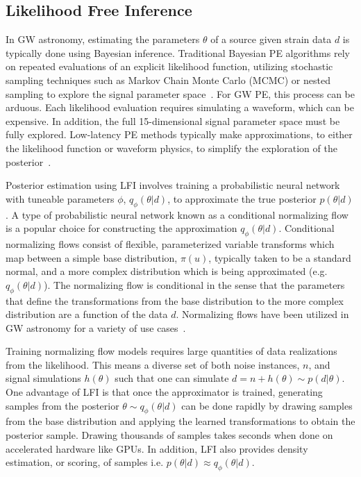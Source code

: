 \begin{refsection}
\section{Likelihood Free Inference} \label{amp_res_sec:lfi}
In GW astronomy, estimating the parameters $\theta$ of a source given strain data $d$ is typically done using Bayesian inference. 
Traditional Bayesian PE algorithms rely on repeated evaluations of an explicit likelihood function, utilizing stochastic sampling techniques such as Markov Chain Monte Carlo (MCMC) or nested sampling to explore the signal parameter space~\cite{Ashton_2019, lalinference_paper}. 
For GW PE, this process can be arduous. 
Each likelihood evaluation requires simulating a waveform, which can be expensive. 
In addition, the full 15-dimensional signal parameter space must be fully explored. 
Low-latency PE methods typically make approximations, to either the likelihood function or waveform physics, to simplify the exploration of the posterior~\cite{Canizares:2014fya, Morisaki:2023kuq, Morisaki:2020oqk, Singer_2016}.

Posterior estimation using LFI involves training a probabilistic neural network with tuneable parameters $\phi$, $q_\phi(\theta | d)$, to approximate the true posterior $p(\theta | d)$. 
A type of probabilistic neural network known as a conditional normalizing flow~\cite{papamakarios2021normalizing} is a popular choice for constructing the approximation $q_\phi(\theta | d)$. 
Conditional normalizing flows consist of flexible, parameterized variable transforms which map between a simple base distribution, $\pi(u)$, typically taken to be a standard normal, and a more complex distribution which is being approximated (e.g. $q_\phi(\theta|d)$). 
The normalizing flow is conditional in the sense that the parameters that define the transformations from the base distribution to the more complex distribution are a function of the data $d$. 
Normalizing flows have been utilized in GW astronomy for a variety of use cases~\cite{Dax_2021, Dax_2025, Williams:2021qyt, PhysRevD.109.102004}.

Training normalizing flow models requires large quantities of data realizations from the likelihood. 
This means a diverse set of both noise instances, $n$, and signal simulations $h(\theta)$ such that one can simulate $d = n + h(\theta) \sim p(d|\theta)$. 
One advantage of LFI is that once the approximator is trained, generating samples from the posterior $\theta \sim q_\phi(\theta | d)$ can be done rapidly by drawing samples from the base distribution and applying the learned transformations to obtain the posterior sample. 
Drawing thousands of samples takes seconds when done on accelerated hardware like GPUs. 
In addition, LFI also provides density estimation, or scoring, of samples i.e. $p(\theta \vert d)\approx q_\phi(\theta \vert d)$.


\end{refsection}
